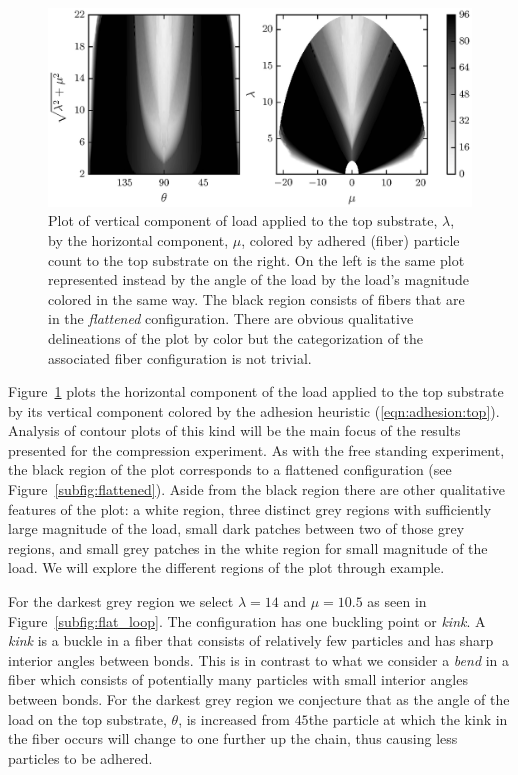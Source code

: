 	\begin{figure}[t]
		\begin{center}
			\includegraphics{./fig/ch3/push/ref/grid.eps}
		\end{center}		
		\caption{Plot of vertical component of load applied to the top substrate, $\lambda$, by the horizontal component, $\mu$, colored by adhered (fiber) particle count to the top substrate on the right. On the left is the same plot represented instead by the angle of the load by the load's magnitude colored in the same way. The black region consists of fibers that are in the \textit{flattened} configuration. There are obvious qualitative delineations of the plot by color but the categorization of the associated fiber configuration is not trivial.
		\label{fig:push:ref}}
	\end{figure}

Figure~\ref{fig:push:ref} plots the horizontal component of the load applied to the top substrate by its vertical component colored by the adhesion heuristic (\ref{eqn:adhesion:top}). Analysis of contour plots of this kind will be the main focus of the results presented for the compression experiment. As with the free standing experiment, the black region of the plot corresponds to a flattened configuration (see Figure~\ref{subfig:flattened}). Aside from the black region there are other qualitative features of the plot: a white region, three distinct grey regions with sufficiently large magnitude of the load, small dark patches between two of those grey regions, and small grey patches in the white region for small magnitude of the load. We will explore the different regions of the plot through example.

For the darkest grey region we select $\lambda=14$ and $\mu=10.5$ as seen in Figure~\ref{subfig:flat_loop}. The configuration has one buckling point or \textit{kink}. A \textit{kink} is a buckle in a fiber that consists of relatively few particles and has sharp interior angles between bonds. This is in contrast to what we consider a \textit{bend} in a fiber which consists of potentially many particles with small interior angles between bonds. For the darkest grey region we conjecture that as the angle of the load on the top substrate, $\theta$, is increased from $45$\textdegree the particle at which the kink in the fiber occurs will change to one further up the chain, thus causing less particles to be adhered.

